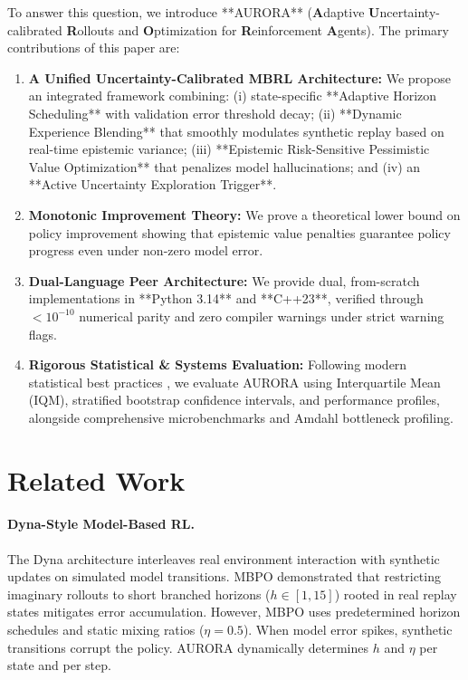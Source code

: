 \documentclass[11pt,a4paper]{article}
\theoremstyle{definition}
\theoremstyle{remark}
\begin{document}
To answer this question, we introduce **AURORA** (\textbf{A}daptive \textbf{U}ncertainty-calibrated \textbf{R}ollouts and \textbf{O}ptimization for \textbf{R}einforcement \textbf{A}gents). The primary contributions of this paper are:
\begin{enumerate}
    \item \textbf{A Unified Uncertainty-Calibrated MBRL Architecture:} We propose an integrated framework combining: (i) state-specific **Adaptive Horizon Scheduling** with validation error threshold decay; (ii) **Dynamic Experience Blending** that smoothly modulates synthetic replay based on real-time epistemic variance; (iii) **Epistemic Risk-Sensitive Pessimistic Value Optimization** that penalizes model hallucinations; and (iv) an **Active Uncertainty Exploration Trigger**.
    \item \textbf{Monotonic Improvement Theory:} We prove a theoretical lower bound on policy improvement showing that epistemic value penalties guarantee policy progress even under non-zero model error.
    \item \textbf{Dual-Language Peer Architecture:} We provide dual, from-scratch implementations in **Python 3.14** and **C++23**, verified through $< 10^{-10}$ numerical parity and zero compiler warnings under strict warning flags.
    \item \textbf{Rigorous Statistical & Systems Evaluation:} Following modern statistical best practices \citep{agarwal2021deep}, we evaluate AURORA using Interquartile Mean (IQM), stratified bootstrap confidence intervals, and performance profiles, alongside comprehensive microbenchmarks and Amdahl bottleneck profiling.
\end{enumerate}

\section{Related Work}
\label{sec:related_work}

\paragraph{Dyna-Style Model-Based RL.}
The Dyna architecture \citep{sutton2018reinforcement} interleaves real environment interaction with synthetic updates on simulated model transitions. MBPO \citep{janner2019mbpo} demonstrated that restricting imaginary rollouts to short branched horizons ($h \in [1, 15]$) rooted in real replay states mitigates error accumulation. However, MBPO uses predetermined horizon schedules and static mixing ratios ($\eta = 0.5$). When model error spikes, synthetic transitions corrupt the policy. AURORA dynamically determines $h$ and $\eta$ per state and per step.
\end{document}
